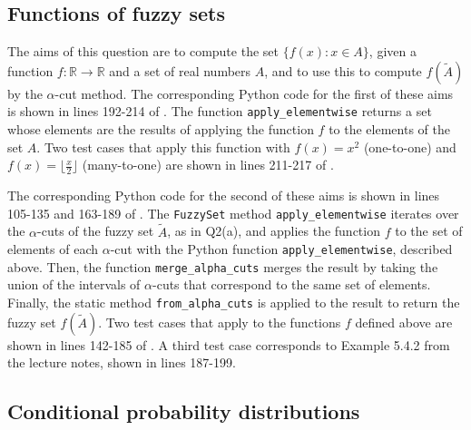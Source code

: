 \subsection{Functions of fuzzy sets}
\label{q2:c}

The aims of this question are to compute the set $\{f(x) : x \in A\}$, given a function
$f : \mathbb{R} \to \mathbb{R}$ and a set of real numbers $A$, and to use this to
compute $f(\tilde{A})$ by the $\alpha$-cut method.
The corresponding Python code for the first of these aims is shown in lines 192-214 of
.
The function \texttt{apply\_elementwise} returns a set whose elements are the results
of applying the function $f$ to the elements of the set $A$.
Two test cases that apply this function with $f(x) = x^2$ (one-to-one) and $f(x) =
  \lfloor\frac{x}{2}\rfloor$ (many-to-one) are shown in lines 211-217 of
.

The corresponding Python code for the second of these aims is shown in lines 105-135
and 163-189 of .
The \texttt{FuzzySet} method \texttt{apply\_elementwise} iterates over the
$\alpha$-cuts of the fuzzy set $\tilde{A}$, as in Q2(a), and applies the function $f$
to the set of elements of each $\alpha$-cut with the Python function
\texttt{apply\_elementwise}, described above.
Then, the function \texttt{merge\_alpha\_cuts} merges the result by taking the union of
the intervals of $\alpha$-cuts that correspond to the same set of elements.
Finally, the static method \texttt{from\_alpha\_cuts} is applied to the result to
return the fuzzy set $f(\tilde{A})$.
Two test cases that apply to the functions $f$ defined above are shown in lines 142-185
of .
A third test case corresponds to Example 5.4.2 from the lecture notes, shown in lines
187-199.

\subsection{Conditional probability distributions}
\label{q2:d}

